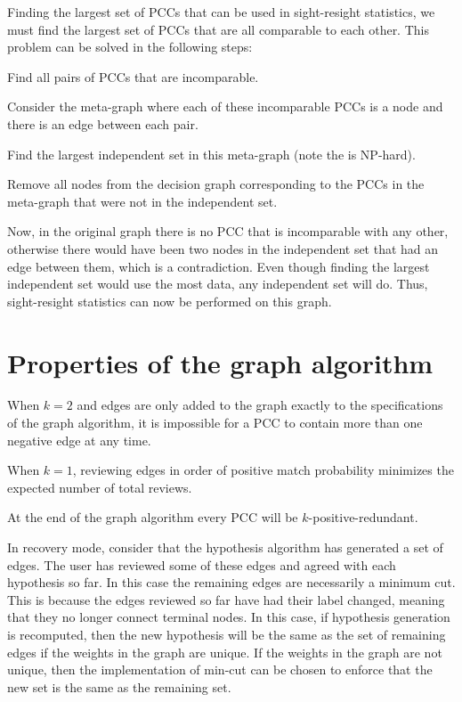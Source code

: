 \begin{appendices}
Finding the largest set of PCCs that can be used in sight-resight statistics, we must find the largest set of
  PCCs that are all comparable to each other.
This problem can be solved in the following steps:
\begin{enumln}
\item Find all pairs of PCCs that are incomparable.
\item Consider the meta-graph where each of these incomparable PCCs is a node and there is an edge between each
  pair.
\item Find the largest independent set in this meta-graph (note the is NP-hard).
\item Remove all nodes from the decision graph corresponding to the PCCs in the meta-graph that were not in the
  independent set.
\end{enumln}
Now, in the original graph there is no PCC that is incomparable with any other, otherwise there would have been
  two nodes in the independent set that had an edge between them, which is a contradiction.
Even though finding the largest independent set would use the most data, any independent set will do.
Thus, sight-resight statistics can now be performed on this graph.


\chapter{Properties of the graph algorithm}\label{app:graphprop}


\begin{enumln}
\item When $k=2$ and edges are only added to the graph exactly to the specifications of the graph algorithm, it
  is impossible for a PCC to contain more than one negative edge at any time.

\item When $k=1$, reviewing edges in order of positive match probability minimizes the expected number of total
  reviews.

\item At the end of the graph algorithm every PCC will be $k$-positive-redundant.

\item In recovery mode, consider that the hypothesis algorithm has generated a set of edges.
The user has reviewed some of these edges and agreed with each hypothesis so far.
In this case the remaining edges are necessarily a minimum cut.
This is because the edges reviewed so far have had their label changed, meaning that they no longer connect
  terminal nodes.
In this case, if hypothesis generation is recomputed, then the new hypothesis will be the same as the set of
  remaining edges if the weights in the graph are unique.
If the weights in the graph are not unique, then the implementation of min-cut can be chosen to enforce that the
  new set is the same as the remaining set.


\end{enumln}
\end{appendices}
